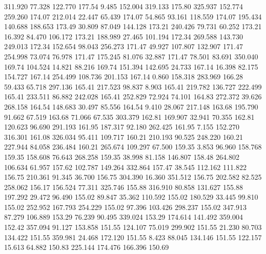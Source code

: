  311.920   77.328  122.770       177.54
   9.485  152.004  319.133       175.80
 325.937  152.774  259.260       174.07
 212.014   22.447   65.439       174.07
  54.865   93.161  118.559       174.07
 195.434  140.688  188.653       173.49
  30.809   87.049  144.128       173.21
 240.426   79.731   60.252       173.21
  16.392   84.470  106.172       173.21
 188.989   27.465  101.194       172.34
 269.588  143.730  249.013       172.34
 152.654   98.043  256.273       171.47
  49.927  107.807  132.907       171.47
 254.998   73.074   76.978       171.47
 175.245   81.076   32.887       171.47
  78.501   83.691  350.040       169.74
 104.524   14.821   88.216       169.74
 151.394  142.695   24.733       167.14
  16.398   82.175  154.727       167.14
 254.499  108.736  201.153       167.14
   0.860  158.318  283.969       166.28
  59.433   65.718  297.136       165.41
 217.523   98.837    8.903       165.41
 219.782  136.727  222.499       165.41
 233.511   86.882  242.028       165.41
 252.829   72.924   74.101       164.83
 272.372   39.626  268.158       164.54
 148.683   30.497   85.556       164.54
   9.410   28.067  217.148       163.68
 195.790   91.662   67.519       163.68
  71.066   67.535  303.379       162.81
 169.907   32.941   70.355       162.81
 120.623   96.690  291.193       161.95
 187.317   92.180  262.425       161.95
   7.155  152.270  316.301       161.08
 326.034   95.411  109.717       160.21
 210.193   90.525  248.220       160.21
 227.944   84.058  236.484       160.21
 265.674  109.297   67.500       159.35
   3.853   96.960  158.768       159.35
 158.608   76.643  268.258       159.35
  38.998   81.158  146.807       158.48
 264.802  106.634   61.957       157.62
 102.787  149.264  332.864       157.47
  38.545  112.162  111.822       156.75
 210.361   91.345   36.700       156.75
 304.390   16.360  351.512       156.75
 202.582   82.525  258.062       156.17
 156.524   77.311  325.746       155.88
 316.910   80.858  131.627       155.88
 197.292   29.472   96.490       155.02
  89.847   35.362  110.592       155.02
 180.529   33.445   99.810       155.02
 252.952  167.793  254.229       155.02
  97.396  103.426  298.237       155.02
 347.913   87.279  106.889       153.29
  76.239   90.495  339.024       153.29
 174.614  141.492  359.004       152.42
 357.094   91.127  153.858       151.55
 124.107   75.019  299.902       151.55
  21.230   80.703  134.422       151.55
 359.981   24.468  172.120       151.55
   8.423   88.045  134.146       151.55
 122.157   15.613   64.882       150.83
 225.144  174.476  166.396       150.69
